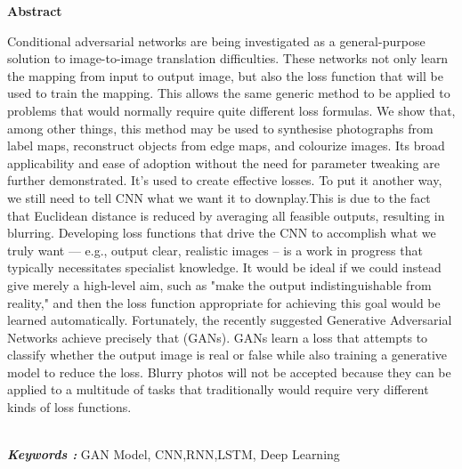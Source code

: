 \begin{center}
	\textbf{\textbf{\fontsize{16pt}{24pt}\selectfont Abstract}}
\end{center}
\par Conditional adversarial networks are being investigated as a general-purpose solution to image-to-image translation difficulties. These networks not only learn the mapping from input to output image, but also the loss function that will be used to train the mapping. This allows the same generic method to be applied to problems that would normally require quite different loss formulas. We show that, among other things, this method may be used to synthesise photographs from label maps, reconstruct objects from edge maps, and colourize images. Its broad applicability and ease of adoption without the need for parameter tweaking are further demonstrated. It's used to create effective losses. To put it another way, we still need to tell CNN what we want it to downplay.This is due to the fact that Euclidean distance is reduced by averaging all feasible outputs, resulting in blurring. Developing loss functions that drive the CNN to accomplish what we truly want — e.g., output clear, realistic images – is a work in progress that typically necessitates specialist knowledge. It would be ideal if we could instead give merely a high-level aim, such as "make the output indistinguishable from reality," and then the loss function appropriate for achieving this goal would be learned automatically. Fortunately, the recently suggested Generative Adversarial Networks achieve precisely that (GANs). GANs learn a loss that attempts to classify whether the output image is real or false while also training a generative model to reduce the loss. Blurry photos will not be accepted because they can be applied to a multitude of tasks that traditionally would require very different kinds of loss functions.



\\ \textbf{\textit{Keywords : }} GAN Model, CNN,RNN,LSTM, Deep Learning

